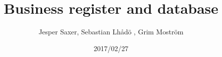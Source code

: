\documentclass[11pt]{article}
\begin{document}
\title{Business register and database}
\author{Jesper Saxer, Sebastian Lhådö , Grim Moström}
\date{2017/02/27}
\maketitle
\end{document}
